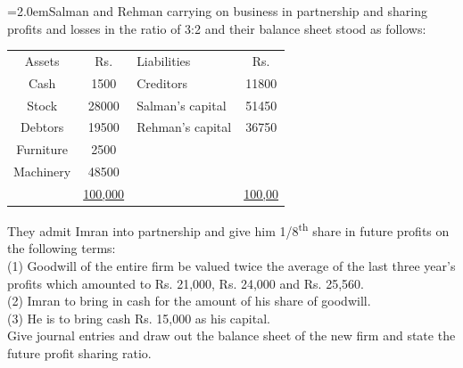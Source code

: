 \documentclass[11pt,a4paper]{article}
\newcommand{\lqn}[2]{\Needspace{6\baselineskip}\par\medskip\noindent\hangindent=2.0em\hangafter=1\makebox[2.0em][l]{\textbf{#1.}}#2\par}
\begin{document}
\lqn{87}{Salman and Rehman carrying on business in partnership and sharing profits and losses in the ratio of 3:2 and their balance sheet stood as follows:\par
\par\smallskip\noindent\hspace*{1.2em}\begin{tabular}{|cclc|}
\hline
Assets & Rs. & Liabilities & Rs. \\
Cash & 1500 & Creditors & 11800 \\
Stock & 28000 & Salman’s capital & 51450 \\
Debtors & 19500 & Rehman’s capital & 36750 \\
Furniture & 2500 &  &  \\
Machinery & 48500 &  &  \\
 & \underline{100,000} &  & \underline{100,00} \\
\hline
\end{tabular}\par\smallskip
They admit Imran into partnership and give him 1/8\textsuperscript{th}  share in future profits on the following terms:\\
(1) Goodwill of the entire firm be valued twice the average of the last three year’s profits which amounted to Rs. 21,000, Rs. 24,000 and Rs. 25,560.\\
(2) Imran to bring in cash for the amount of his share of goodwill.\\
(3) He is to bring cash Rs. 15,000 as his capital.\\
Give journal entries and draw out the balance sheet of the new firm and state the future profit sharing ratio.\par
}
\end{document}
